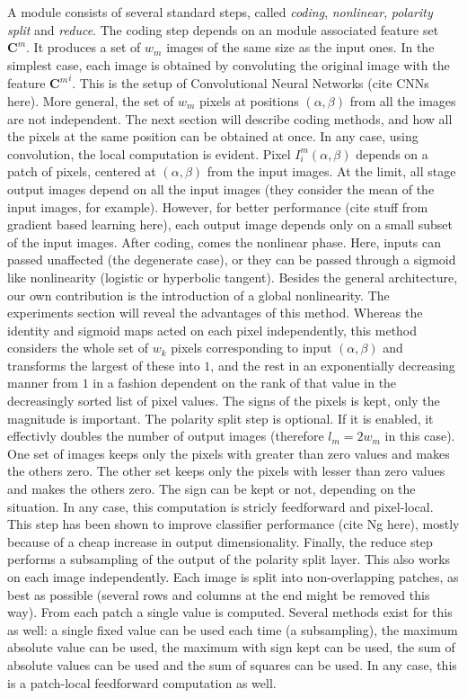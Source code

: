 \documentclass[12pt,a4paper,oneside,english]{UPBThesis}
\begin{document}
A module consists of several standard steps, called \emph{coding}, \emph{nonlinear}, \emph{polarity split} and \emph{reduce}. The coding step depends on an module associated feature set $\textbf{C}^m$. It produces a set of $w_m$ images of the same size as the input ones. In the simplest case, each image is obtained by convoluting the original image with the feature ${\textbf{C}^m}^i$. This is the setup of Convolutional Neural Networks (cite CNNs here). More general, the set of $w_m$ pixels at positions $(\alpha,\beta)$ from all the images are not independent. The next section will describe coding methods, and how all the pixels at the same position can be obtained at once. In any case, using convolution, the local computation is evident. Pixel $I^m_i(\alpha,\beta)$ depends on a patch of pixels, centered at $(\alpha,\beta)$ from the input images. At the limit, all stage output images depend on all the input images (they consider the mean of the input images, for example). However, for better performance (cite stuff from gradient based learning here), each output image depends only on a small subset of the input images. After coding, comes the nonlinear phase. Here, inputs can passed unaffected (the degenerate case), or they can be passed through a sigmoid like nonlinearity (logistic or hyperbolic tangent). Besides the general architecture, our own contribution is the introduction of a global nonlinearity. The experiments section will reveal the advantages of this method. Whereas the identity and sigmoid maps acted on each pixel independently, this method considers the whole set of $w_k$ pixels corresponding to input $(\alpha,\beta)$ and transforms the largest of these into $1$, and the rest in an exponentially decreasing manner from $1$ in a fashion dependent on the rank of that value in the decreasingly sorted list of pixel values. The signs of the pixels is kept, only the magnitude is important. The polarity split step is optional. If it is enabled, it effectivly doubles the number of output images (therefore $l_m = 2w_m$ in this case). One set of images keeps only the pixels with greater than zero values and makes the others zero. The other set keeps only the pixels with lesser than zero values and makes the others zero. The sign can be kept or not, depending on the situation. In any case, this computation is stricly feedforward and pixel-local. This step has been shown to improve classifier performance (cite Ng here), mostly because of a cheap increase in output dimensionality. Finally, the reduce step performs a subsampling of the output of the polarity split layer. This also works on each image independently. Each image is split into non-overlapping patches, as best as possible (several rows and columns at the end might be removed this way). From each patch a single value is computed. Several methods exist for this as well: a single fixed value can be used each time (a subsampling), the maximum absolute value can be used, the maximum with sign kept can be used, the sum of absolute values can be used and the sum of squares can be used. In any case, this is a patch-local feedforward computation as well.
\end{document}
